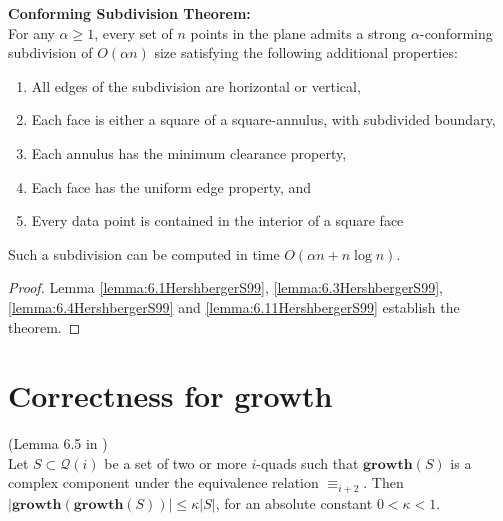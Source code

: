 \textbf{Conforming Subdivision Theorem:} \\
	For any $\alpha\geq 1$, every set of $n$ points in the plane admits a strong
	$\alpha$-conforming subdivision of $O(\alpha n)$ size satisfying the
	following additional properties:
\begin{enumerate}	
	\item All edges of the subdivision are horizontal or vertical,
	\item Each face is either a square of a square-annulus, with subdivided
		boundary,
	\item Each annulus has the minimum clearance property,
	\item Each face has the uniform edge property, and
	\item Every data point is contained in the interior of a square face
\end{enumerate}
	Such a subdivision can be computed in time $O(\alpha n + n\log n)$.

\begin{proof}
Lemma \ref{lemma:6.1HershbergerS99}, \ref{lemma:6.3HershbergerS99}, \ref{lemma:6.4HershbergerS99} and \ref{lemma:6.11HershbergerS99} establish the theorem.
\end{proof}

\section{Correctness for \textbf{growth}} \label{section:correctnessgrowth}

\begin{Lemma} (Lemma 6.5 in \cite{HershbergerS99}) \label{lemma:growthgrowthS}\\
Let $S \subset \mathcal{Q}(i)$ be a set of two or more $i$-quads such that $\mathbf{growth}(S)$ is a complex component under the equivalence relation $\equiv_{i+2}$. Then $|\mathbf{growth}(\mathbf{growth}(S))| \leq \kappa|S|$, for an absolute constant $0 < \kappa < 1$.
\end{Lemma}

